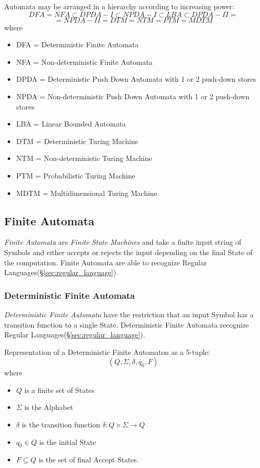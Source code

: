 Automata may be arranged in a hierarchy according to increasing power:
\[
    DFA = NFA \subset DPDA-I \subset NPDA-I \subset LBA \subset DPDA-II =
\]\[
    = NPDA-II = DTM = NTM = PTM = MDTM
\]
where
\begin{itemize}
\item DFA = Deterministic Finite Automata
\item NFA = Non-deterministic Finite Automata
\item DPDA = Deterministic Push Down Automata with 1
  or 2 push-down stores
\item NPDA = Non-deterministic Push Down Automata
  with 1 or 2 push-down stores
\item LBA = Linear Bounded Automata
\item DTM = Deterministic Turing Machine
\item NTM = Non-deterministic Turing Machine
\item PTM = Probabilistic Turing Machine
\item MDTM = Multidimensional Turing Machine
\end{itemize}



\subsection{Finite Automata}\label{sec:finite_automata}

\emph{Finite Automata} are \emph{Finite State Machines} and take a
finite input string of Symbols and either accepts or rejects the input
depending on the final State of the computation. Finite Automata are
able to recognize Regular Languages(\S\ref{sec:regular_language}).



\subsubsection{Deterministic Finite Automata}\label{sec:dfa}

\emph{Deterministic Finite Automata} have the restriction that an
input Symbol has a transition function to a single State.
Deterministic Finite Automata recognize Regular
Languages(\S\ref{sec:regular_language}).

Representation of a Deterministic Finite Automaton as a 5-tuple:
\[
    (Q,\Sigma,\delta,q_0,F)
\]
where
\begin{itemize}
\item $Q$ is a finite set of States
\item $\Sigma$ is the Alphabet
\item $\delta$ is the transition function $\delta: Q \times
  \Sigma \rightarrow Q$
\item $q_0 \in Q$ is the initial State
\item $F \subseteq Q$ is the set of final Accept States.
\end{itemize}

